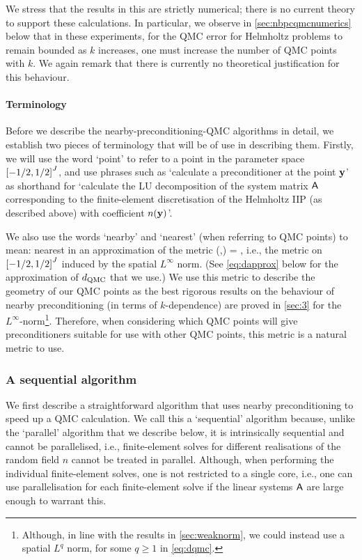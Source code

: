 We stress that the results in this  are strictly numerical; there is no current theory to support these calculations. In particular, we observe in \cref{sec:nbpcqmcnumerics} below that in these experiments, for the QMC error for Helmholtz problems to remain bounded as $k$ increases, one must increase the number of QMC points with $k.$ We again remark that there is currently no theoretical justification for this behaviour.


\paragraph{Terminology} Before we describe the nearby-preconditioning-QMC algorithms in detail, we establish two pieces of terminology that will be of use in describing them. Firstly, we will use the word `point' to refer to a point in the parameter space $\cube{J}$, and use phrases such as `calculate a preconditioner at the point $\mathbf{y}$' as shorthand for `calculate the LU decomposition of the system matrix $\mathsf{A}$ corresponding to the finite-element discretisation of the Helmholtz IIP (as described above) with coefficient $n(\mathbf{y})$'.

We also use the words `nearby' and `nearest' (when referring to QMC points) to mean: nearest in an approximation of the metric
\beq\label{eq:dqmc}
\dQMC(\byo,\byt) = ,
\eeq
i.e., the metric on $\cube{J}$ induced by the spatial $L^\infty$ norm. (See \cref{eq:dapprox} below for the approximation of $d_{\mathrm{QMC}}$ that we use.) We use this metric to describe the geometry of our QMC points as the best rigorous results on the behaviour of nearby preconditioning (in terms of $k$-dependence) are proved in \cref{sec:3} for the $L^\infty$-norm\footnote{Although, in line with the results in \cref{sec:weaknorm}, we could instead use a spatial $L^q$ norm, for some $q \geq 1$ in \cref{eq:dqmc}.}. Therefore, when considering which QMC points will give preconditioners suitable for use with other QMC points, this metric is a natural metric to use.


\subsubsection{A sequential algorithm}
We first describe a straightforward algorithm that uses nearby preconditioning to speed up a QMC calculation. We call this a `sequential' algorithm because, unlike the `parallel' algorithm that we describe below, it is intrinsically sequential and cannot be parallelised, i.e., finite-element solves for different realisations of the random field $n$ cannot be treated in parallel. Although, when performing the individual finite-element solves, one is not restricted to a single core, i.e., one can use parallelisation for each finite-element solve  if the linear systems $\mathsf{A}$ are large enough to warrant this.

